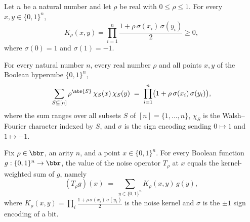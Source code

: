 \begin{lemma}
\label{BooleanAnalysis.Hypercontractivity.noiseKernel_nonneg}
\leanok
{}
Let $n$ be a natural number and let $\rho$ be real with $0\le\rho\le1$.
For every $x,y\in\{0,1\}^n$,
\[
  K_\rho(x,y)=\prod_{i=1}^{n}\frac{1+\rho\,\sigma(x_i)\,\sigma(y_i)}{2}\ge0,
\]
where $\sigma(0)=1$ and $\sigma(1)=-1$.
\end{lemma}

\begin{lemma}
\label{BooleanAnalysis.Hypercontractivity.sum_fourier_kernel}
\leanok
{}
For every natural number $n$, every real number $\rho$ and all points $x, y$ of the Boolean hypercube $\{0,1\}^n$,
\[
  \sum_{S \subseteq [n]} \rho^{\abs{S}}\,\chi_S(x)\,\chi_S(y)
  \;=\; \prod_{i=1}^{n} \bigl(1 + \rho\,\sigma(x_i)\,\sigma(y_i)\bigr),
\]
where the sum ranges over all subsets $S$ of $[n]=\{1,\dots,n\}$, $\chi_S$ is the
Walsh--Fourier character indexed by $S$, and $\sigma$ is the sign encoding sending
$0\mapsto 1$ and $1\mapsto -1$.
\end{lemma}

\begin{lemma}
\label{BooleanAnalysis.Hypercontractivity.noiseOp_eq_kernel_sum}
\leanok
{}
Fix $\rho \in \bbr$, an arity $n$, and a point $x \in \{0,1\}^n$. For every Boolean
function $g : \{0,1\}^n \to \bbr$, the value of the noise operator $T_\rho$ at $x$
equals the kernel-weighted sum of $g$, namely
\[
  (T_\rho g)(x) \;=\; \sum_{y \in \{0,1\}^n} K_\rho(x,y)\, g(y),
\]
where $K_\rho(x,y) = \prod_{i} \tfrac{1 + \rho\,\sigma(x_i)\,\sigma(y_i)}{2}$ is the
noise kernel and $\sigma$ is the $\pm 1$ sign encoding of a bit.
\end{lemma}

